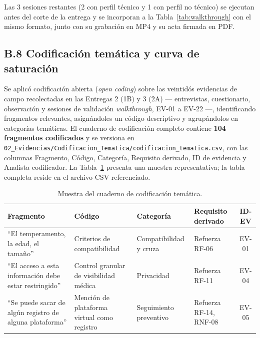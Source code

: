 \documentclass[journal,onecolumn]{IEEEtran}
\begin{document}
	Las 3 sesiones restantes (2 con perfil técnico y 1 con perfil no técnico) se
	ejecutan antes del corte de la entrega y se incorporan a la
	Tabla~\ref{tab:walkthrough} con el mismo formato, junto con su grabación en
	MP4 y su acta firmada en PDF.
	
	
	\subsection*{B.8 Codificación temática y curva de saturación}
	\label{sec:codificacion}
	
	Se aplicó codificación abierta (\emph{open coding}) sobre las veintidós
	evidencias de campo recolectadas en las Entregas 2 (1B) y 3 (2A)
	--- entrevistas, cuestionario, observación y sesiones de validación
	\emph{walkthrough}, EV-01 a EV-22 ---, identificando fragmentos relevantes,
	asignándoles un código descriptivo y agrupándolos en categorías temáticas.
	El cuaderno de codificación completo contiene \textbf{104 fragmentos
		codificados} y se versiona en
	\texttt{02\_Evidencias/Codificacion\_Tematica/codificacion\_tematica.csv},
	con las columnas Fragmento, Código, Categoría, Requisito derivado, ID de
	evidencia y Analista codificador. La Tabla~\ref{tab:codificacion-muestra}
	presenta una muestra representativa; la tabla completa reside en el archivo
	CSV referenciado.
	
	\begin{table}[H]
		\centering
		\caption{Muestra del cuaderno de codificación temática.}
		\label{tab:codificacion-muestra}
		\small
		\begin{tabularx}{\textwidth}{@{}X p{3.0cm} p{2.4cm} p{2.2cm} c@{}}
			\toprule
			\textbf{Fragmento} & \textbf{Código} & \textbf{Categoría} & \textbf{Requisito derivado} & \textbf{ID-EV} \\
			\midrule
			``El temperamento, la edad, el tamaño'' & Criterios de compatibilidad & Compatibilidad y cruza & Refuerza RF-06 & EV-01 \\
			\addlinespace
			``El acceso a esta información debe estar restringido'' & Control granular de visibilidad médica & Privacidad & Refuerza RF-11 & EV-04 \\
			\addlinespace
			``Se puede sacar de algún registro de alguna plataforma'' & Mención de plataforma virtual como registro & Seguimiento preventivo & Refuerza RF-14, RNF-08 & EV-05 \\
			\bottomrule
		\end{tabularx}
	\end{table}
	
\end{document}
